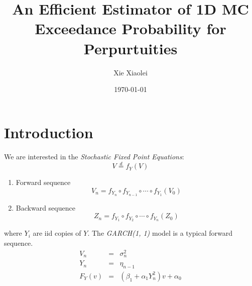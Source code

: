 \documentclass{beamer}
\title{An Efficient Estimator of 1D MC Exceedance Probability for Perpurtuities} %
\author{Xie Xiaolei} %
\institute[UCPH] %
{
Copenhagen University  \\ %
\medskip
\textit{hnq365@math.ku.dk} %
}
\date{\today} %
\begin{document}
\begin{frame}
\titlepage %
\end{frame}


\section{Introduction}
\begin{frame}
  We are interested in the {\it Stochastic Fixed Point Equations}:
  \[
  V \overset{d}{=} f_Y(V)
  \]
  \begin{enumerate}
  \item Forward sequence
    \[
    V_n = f_{Y_n} \circ f_{Y_{n-1}} \circ \cdots \circ f_{Y_1} (V_0)
    \]
    \item Backward sequence
      \[
      Z_n  = f_{Y_1} \circ f_{Y_{2}} \circ \cdots \circ f_{Y_n} (Z_0)
      \]
    \end{enumerate}
    where $Y_i$ are iid copies of $Y$. The {\it GARCH(1, 1)} model is
    a typical forward sequence.
    \begin{eqnarray*}
      V_n &=& \sigma_n^2 \\
      Y_n &=& \eta_{n-1} \\
      F_Y(v) &=& (\beta_1 + \alpha_1 Y_n^2) v + \alpha_0
    \end{eqnarray*}
\end{frame}
\end{document}
